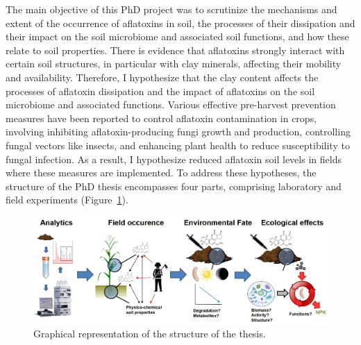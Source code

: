 The main objective of this PhD project was to scrutinize the mechanisms and extent of the occurrence of aflatoxins in soil, the processes of their dissipation and their impact on the soil microbiome and associated soil functions, and how these relate to soil properties. There is evidence that aflatoxins strongly interact with certain soil structures, in particular with clay minerals, affecting their mobility and availability. Therefore, I hypothesize that the clay content affects the processes of aflatoxin dissipation and the impact of aflatoxins on the soil microbiome and associated functions. Various effective pre-harvest prevention measures have been reported to control aflatoxin contamination in crops, involving inhibiting aflatoxin-producing fungi growth and production, controlling fungal vectors like insects, and enhancing plant health to reduce susceptibility to fungal infection. As a result, I hypothesize reduced aflatoxin soil levels in fields where these measures are implemented. To address these hypotheses, the structure of the PhD thesis encompasses four parts, comprising laboratory and field experiments (Figure~\ref{fig:Thesis_structure}). 

\begin{figure}[ht!]
\centering
 \includegraphics[width=1.125\textwidth,center]{figures/thesis structure.jpg}
\decoRule
\captionsetup{labelfont=bf, justification=raggedright, singlelinecheck=off, width=1.125\textwidth}
\caption{Graphical representation of the structure of the thesis.}
\label{fig:Thesis_structure}
\end{figure}
\afterpage{\FloatBarrier}


